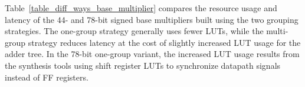 \documentclass[sigconf,9pt,review]{acmart}
\begin{document}
Table~\ref{table_diff_ways_base_multiplier} compares the resource usage and latency of the 44- and 78-bit signed base multipliers built using the two grouping strategies.
The one-group strategy generally uses fewer LUTs, while the multi-group strategy reduces latency at the cost of slightly increased LUT usage for the adder tree.
In the 78-bit one-group variant, the increased LUT usage results from the synthesis tools using shift register LUTs to synchronize datapath signals instead of FF registers.

\begin{table}[bt]
\centering
\caption{Comparison of different base multiplier strategies.}
\label{table_diff_ways_base_multiplier}
\end{table}





\end{document}
